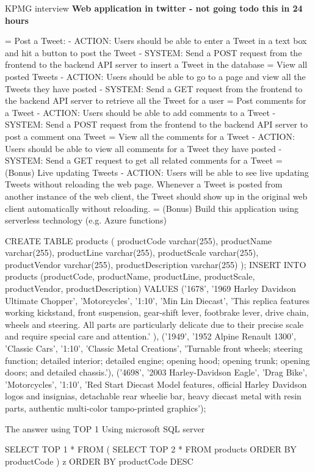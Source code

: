 

KPMG interview
\textbf{Web application in twitter - not going todo this in 24 hours}

= Post a Tweet:
- ACTION: Users should be able to enter a Tweet in a text box and hit a button to post the Tweet
- SYSTEM: Send a POST request from the frontend to the backend API server to insert a Tweet in
the database
= View all posted Tweets
- ACTION: Users should be able to go to a page and view all the Tweets they have posted
- SYSTEM: Send a GET request from the frontend to the backend API server to retrieve all the Tweet
for a user
= Post comments for a Tweet
- ACTION: Users should be able to add comments to a Tweet
- SYSTEM: Send a POST request from the frontend to the backend API server to post a comment
ona Tweet
= View all the comments for a Tweet
- ACTION: Users should be able to view all comments for a Tweet they have posted
- SYSTEM: Send a GET request to get all related comments for a Tweet
= (Bonus) Live updating Tweets
- ACTION: Users will be able to see live updating Tweets without reloading the web page. Whenever
a Tweet is posted from another instance of the web client, the Tweet should show up in the original
web client automatically without reloading.
= (Bonus) Build this application using serverless technology (e.g. Azure functions)

\begin{listing}[caption={SQL Query for KPMG Interview}]
CREATE TABLE products (
productCode varchar(255),
productName varchar(255),
productLine varchar(255),
productScale varchar(255),
productVendor varchar(255),
productDescription varchar(255)
);
INSERT INTO products (productCode, productName, productLine, productScale,
productVendor, productDescription)
VALUES ('1678',
'1969 Harley Davidson Ultimate Chopper',
'Motorcycles',
'1:10',
'Min Lin Diecast',
'This replica features working kickstand, front suspension, gear-shift lever, footbrake lever, drive chain, wheels and steering. All parts are particularly delicate due to their precise scale and require special care and attention.'
),
('1949',
'1952 Alpine Renault 1300',
'Classic Cars',
'1:10',
'Classic Metal Creations',
'Turnable front wheels; steering function; detailed interior; detailed engine; opening hood; opening trunk; opening doors; and detailed chassis.'),
('4698',
'2003 Harley-Davidson Eagle',
'Drag Bike',
'Motorcycles',
'1:10',
'Red Start Diecast Model features, official Harley Davidson logos and insignias, detachable rear wheelie bar, heavy diecast metal with resin parts, authentic multi-color tampo-printed graphics');
\end{listing}

The answer using TOP 1 Using microsoft SQL server
\begin{listing}[caption={SQL Query for KPMG Interview -- Answer}]
SELECT TOP 1 *
FROM (
  SELECT TOP 2 * 
  FROM products
  ORDER BY productCode
) z
ORDER BY productCode DESC
\end{listing}